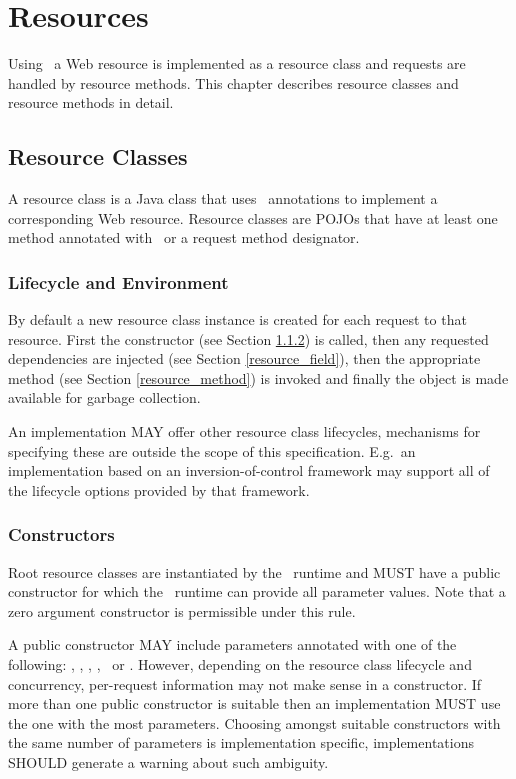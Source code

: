 \chapter{Resources}
\label{resources}

Using \jaxrs\, a Web resource is implemented as a resource class and requests are handled by resource methods. This chapter describes resource classes and resource methods in detail.

\section{Resource Classes}

A resource class is a Java class that uses \jaxrs\ annotations to implement a corresponding Web resource. Resource classes are POJOs that have at least one method annotated with \Path\ or a request method designator.

\subsection{Lifecycle and Environment}

By default a new resource class instance is created for each request to that resource. First the constructor (see Section \ref{resource_class_constructor}) is called, then any requested dependencies are injected (see Section \ref{resource_field}), then the appropriate method (see Section \ref{resource_method}) is invoked and finally the object is made available for garbage collection.

An implementation MAY offer other resource class lifecycles, mechanisms for specifying these are outside the scope of this specification. E.g.~an implementation based on an inversion-of-control framework may support all of the lifecycle options provided by that framework.

\subsection{Constructors}
\label{resource_class_constructor}

Root resource classes are instantiated by the \jaxrs\ runtime and MUST have a public constructor for which the \jaxrs\ runtime can provide all parameter values. Note that a zero argument constructor is permissible under this rule.

A public constructor MAY include parameters annotated with one of the following: \Context, \HeaderParam, \CookieParam, \MatrixParam, \QueryParam\ or \PathParam. However, depending on the resource class lifecycle and concurrency, per-request information may not make sense in a constructor. If more than one public constructor is suitable then an implementation MUST use the one with the most parameters. Choosing amongst suitable constructors with the same number of parameters is implementation specific, implementations SHOULD generate a warning about such ambiguity.

